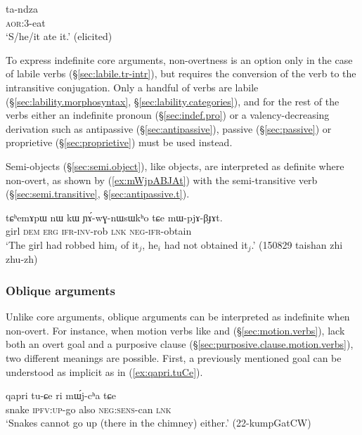 \begin{exe}
\ex \label{ex:tandza}
\gll ta-ndza \\
\textsc{aor}:3\flobv{}-eat \\
\glt `S/he/it ate it.' (elicited)
\end{exe}

To express indefinite core arguments, non-overtness is an option only in the case of labile verbs (§\ref{sec:labile.tr-intr}), but requires the conversion of the verb to the intransitive conjugation. Only a handful of verbs are labile (§\ref{sec:lability.morphosyntax}, §\ref{sec:lability.categories}), and for the rest of the verbs either an indefinite pronoun (§\ref{sec:indef.pro}) or a valency-decreasing derivation such as antipassive (§\ref{sec:antipassive}), passive (§\ref{sec:passive}) or proprietive (§\ref{sec:proprietive}) must be used instead.


Semi-objects (§\ref{sec:semi.object}), like objects, are interpreted as definite where non-overt, as shown by (\ref{ex:mWjpABJAt}) with the semi-transitive verb  (§\ref{sec:semi.transitive}, §\ref{sec:antipassive.t}).

\begin{exe}
\ex \label{ex:mWjpABJAt}
\gll tɕʰemɤpɯ nɯ kɯ ɲɤ́-wɣ-nɯsɯkʰo tɕe mɯ-pjɤ-βɟɤt. \\
girl \textsc{dem} \textsc{erg} \textsc{ifr}-\textsc{inv}-rob \textsc{lnk} \textsc{neg}-\textsc{ifr}-obtain \\
\glt `The girl had robbed him$_i$ of it$_j$, he$_i$ had not obtained it$_j$.' (150829 taishan zhi zhu-zh)
\end{exe}

\subsubsection{Oblique arguments}
Unlike core arguments, oblique arguments can be interpreted as indefinite when non-overt. For instance, when motion verbs like  and  (§\ref{sec:motion.verbs}), lack both an overt goal and a purposive clause (§\ref{sec:purposive.clause.motion.verbs}), two different meanings are possible. First, a previously mentioned goal can be understood as implicit as in (\ref{ex:qapri.tuCe}).

\begin{exe} 
\ex \label{ex:qapri.tuCe}
\gll qapri tu-ɕe ri mɯ́j-cʰa tɕe \\
snake \textsc{ipfv}:\textsc{up}-go also \textsc{neg}:\textsc{sens}-can \textsc{lnk} \\
\glt `Snakes cannot go up (there in the chimney) either.' (22-kumpGatCW)
\end{exe} 

